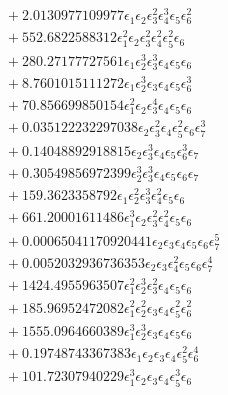 \documentclass[10pt]{article}
\begin{document}
\begin{align*}
&{}  + 2.0130977109977 \epsilon_{1} \epsilon_{2} \epsilon_{3}^{2} \epsilon_{4}^{3} \epsilon_{5} \epsilon_{6}^{2} \\
&{}  + 552.6822588312 \epsilon_{1}^{2} \epsilon_{2} \epsilon_{3}^{2} \epsilon_{4}^{2} \epsilon_{5}^{2} \epsilon_{6} \\
&{}  + 280.27177727561 \epsilon_{1} \epsilon_{2}^{3} \epsilon_{3}^{3} \epsilon_{4} \epsilon_{5} \epsilon_{6} \\
&{}  + 8.7601015111272 \epsilon_{1} \epsilon_{2}^{3} \epsilon_{3} \epsilon_{4} \epsilon_{5} \epsilon_{6}^{3} \\
&{}  + 70.856699850154 \epsilon_{1}^{2} \epsilon_{2} \epsilon_{3}^{4} \epsilon_{4} \epsilon_{5} \epsilon_{6} \\
&{}  + 0.035122232297038 \epsilon_{2} \epsilon_{3}^{2} \epsilon_{4} \epsilon_{5}^{2} \epsilon_{6} \epsilon_{7}^{3} \\
&{}  + 0.14048892918815 \epsilon_{2} \epsilon_{3}^{3} \epsilon_{4} \epsilon_{5} \epsilon_{6}^{3} \epsilon_{7} \\
&{}  + 0.30549856972399 \epsilon_{2}^{3} \epsilon_{3}^{3} \epsilon_{4} \epsilon_{5} \epsilon_{6} \epsilon_{7} \\
&{}  + 159.3623358792 \epsilon_{1} \epsilon_{2}^{2} \epsilon_{3}^{3} \epsilon_{4}^{2} \epsilon_{5} \epsilon_{6} \\
&{}  + 661.20001611486 \epsilon_{1}^{3} \epsilon_{2} \epsilon_{3}^{2} \epsilon_{4}^{2} \epsilon_{5} \epsilon_{6} \\
&{}  + 0.00065041170920441 \epsilon_{2} \epsilon_{3} \epsilon_{4} \epsilon_{5} \epsilon_{6} \epsilon_{7}^{5} \\
&{}  + 0.0052032936736353 \epsilon_{2} \epsilon_{3} \epsilon_{4}^{2} \epsilon_{5} \epsilon_{6} \epsilon_{7}^{4} \\
&{}  + 1424.4955963507 \epsilon_{1}^{2} \epsilon_{2}^{3} \epsilon_{3}^{2} \epsilon_{4} \epsilon_{5} \epsilon_{6} \\
&{}  + 185.96952472082 \epsilon_{1}^{2} \epsilon_{2}^{2} \epsilon_{3} \epsilon_{4} \epsilon_{5}^{2} \epsilon_{6}^{2} \\
&{}  + 1555.0964660389 \epsilon_{1}^{3} \epsilon_{2}^{3} \epsilon_{3} \epsilon_{4} \epsilon_{5} \epsilon_{6} \\
&{}  + 0.19748743367383 \epsilon_{1} \epsilon_{2} \epsilon_{3} \epsilon_{4} \epsilon_{5}^{2} \epsilon_{6}^{4} \\
&{}  + 101.72307940229 \epsilon_{1}^{3} \epsilon_{2} \epsilon_{3} \epsilon_{4} \epsilon_{5}^{3} \epsilon_{6} \\

\end{align*}
\end{document}
